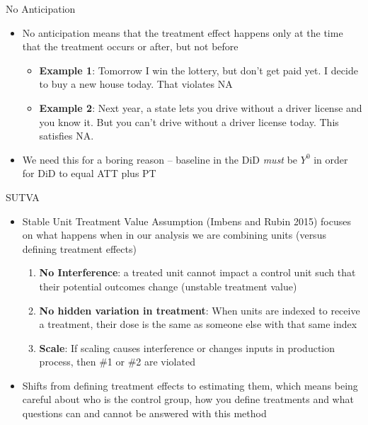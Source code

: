 \documentclass{beamer}
\begin{document}
\begin{frame}{No Anticipation}

\begin{itemize}
\item No anticipation means that the treatment effect happens only at the time that the treatment occurs or after, but not before
	\begin{itemize}
	\item \textbf{Example 1}: Tomorrow I win the lottery, but don't get paid yet. I decide to buy a new house today. That violates NA
	\item \textbf{Example 2}: Next year, a state lets you drive without a driver license and you know it. But you can't drive without a driver license today.  This satisfies NA.
	\end{itemize}
\item We need this for a boring reason -- baseline in the DiD \emph{must} be $Y^0$ in order for DiD to equal ATT plus PT 
\end{itemize}

\end{frame}

\begin{frame}{SUTVA}

\begin{itemize}
\item Stable Unit Treatment Value Assumption (Imbens and Rubin 2015) focuses on what happens when in our analysis we are combining units (versus defining treatment effects)
	\begin{enumerate}
	\item \textbf{No Interference}: a treated unit cannot impact a control unit such that their potential outcomes change (unstable treatment value)
	\item \textbf{No hidden variation in treatment}: When units are indexed to receive a treatment, their dose is the same as someone else with that same index
	\item \textbf{Scale}: If scaling causes interference or changes inputs in production process, then \#1 or \#2 are violated
	\end{enumerate}
\item Shifts from defining treatment effects to estimating them, which means being careful about who is the control group, how you define treatments and what questions can and cannot be answered with this method
\end{itemize}

\end{frame}
\end{document}
